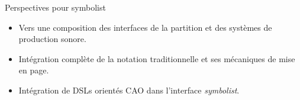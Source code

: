 \documentclass[pdf]{beamer}
\begin{document}
\begin{frame}{Perspectives pour symbolist}
 \begin{itemize}[label=$\square$]
 	\item Vers une composition des interfaces de la partition et des systèmes de production sonore.
 	\item Intégration complète de la notation traditionnelle et ses mécaniques de mise en page.
 	\item Intégration de DSLs orientés CAO dans l'interface \textit{symbolist}.
 \end{itemize}
\end{frame}
\end{document}

